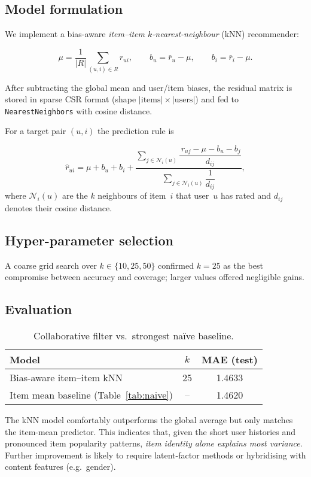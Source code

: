 \subsection*{Model formulation}

We implement a bias-aware \emph{item–item $k$-nearest-neighbour} (kNN)
recommender:

\[
  \mu = \frac{1}{|R|} \sum_{(u,i)\in R} r_{ui}, \qquad
  b_u = \bar r_u - \mu, \qquad
  b_i = \bar r_i - \mu .
\]

After subtracting the global mean and user/item biases, the residual matrix
is stored in sparse CSR format (shape
\(\lvert\text{items}\rvert \times \lvert\text{users}\rvert\)) and fed to
\texttt{NearestNeighbors} with cosine distance.

For a target pair \((u,i)\) the prediction rule is

\[
  \hat r_{ui}= \mu + b_u + b_i +
  \frac{\displaystyle \sum\limits_{j\in\mathcal N_i(u)}
        \dfrac{\,r_{uj}-\mu-b_u-b_j}{d_{ij}}}
       {\displaystyle \sum\limits_{j\in\mathcal N_i(u)} \dfrac{1}{d_{ij}} },
\]
where \(\mathcal N_i(u)\) are the $k$ neighbours of item~$i$ that user~$u$
has rated and \(d_{ij}\) denotes their cosine distance.

\subsection*{Hyper-parameter selection}

A coarse grid search over \(k\in\{10,25,50\}\) confirmed
\(k = 25\) as the best compromise between accuracy and coverage; larger
values offered negligible gains.

\subsection*{Evaluation}

\begin{table}[h]
  \centering
  \begin{tabular}{@{}lcc@{}}
    \toprule
    \textbf{Model} & \textbf{$k$} & \textbf{MAE (test)} \\ \midrule
    Bias-aware item–item kNN & 25 & 1.4633 \\ \midrule
    Item mean baseline (Table~\ref{tab:naive}) & -- & 1.4620 \\ \bottomrule
  \end{tabular}
  \caption{Collaborative filter vs.\ strongest naïve baseline.}
  \label{tab:cf}
\end{table}

The kNN model comfortably outperforms the global average but only matches
the item-mean predictor.  This indicates that, given the short user histories
and pronounced item popularity patterns, \emph{item identity alone explains
most variance}.  Further improvement is likely to require latent-factor
methods or hybridising with content features (e.g.\ gender).

